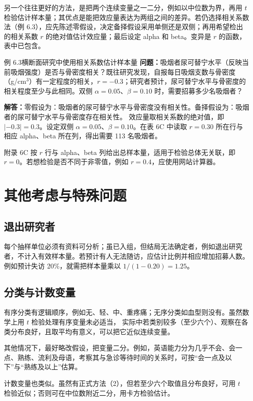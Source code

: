 另一个往往更好的方法，是把两个连续变量之一二分，例如以中位数为界，再用 $t$ 检验估计样本量；其优点是能把效应量表达为两组之间的差异。若仍选择相关系数法（例 6.3），应先陈述零假设，决定备择假设采用单侧还是双侧；再用希望检出的相关系数 $r$ 的绝对值估计效应量；最后设定 alpha 和 beta。变异是 $r$ 的函数，表中已包含。
\begin{bookbox}{例 6.3\quad 横断面研究中使用相关系数估计样本量}
\textbf{问题：}吸烟者尿可替宁水平（反映当前吸烟强度）是否与骨密度相关？既往研究发现，自报每日吸烟支数与骨密度（g/cm$^3$）有一定程度的相关，$r=-0.3$；研究者预计，尿可替宁水平与骨密度的相关程度至少与此相同。双侧 $\alpha=0.05$、$\beta=0.10$ 时，需要招募多少名吸烟者？

\textbf{解答：}零假设为：吸烟者的尿可替宁水平与骨密度没有相关性。备择假设为：吸烟者的尿可替宁水平与骨密度存在相关性。
效应量取相关系数的绝对值，即 $|-0.3|=0.3$。设定双侧 $\alpha=0.05$、$\beta=0.10$。在表 6C 中读取 $r=0.30$ 所在行与相应 alpha、beta 所在列，得出需要 113 名吸烟者。
\end{bookbox}
附录 6C 按 $r$ 行与 alpha、beta 列给出总样本量，适用于检验总体无关联，即 $r=0$。若想检验是否不同于非零值，例如 $r=0.4$，应使用网站计算器。

\section{其他考虑与特殊问题}
\subsection{退出研究者}
每个抽样单位必须有资料可分析；虽已入组，但结局无法确定者，例如退出研究者，不计入有效样本量。若预计有人无法随访，应估计比例并相应增加招募人数。例如预计失访 20\%，就需把样本量乘以 $1/(1-0.20)=1.25$。

\subsection{分类与计数变量}
有序分类有逻辑顺序，例如无、轻、中、重疼痛；无序分类如血型则没有。虽然数学上用 $t$ 检验处理有序变量未必适当，
实际中若类别较多（至少六个）、观察在各类分布良好，且取平均有意义，可以把它近似连续变量。

其他情况下，最好略改假设，把变量二分。例如，英语能力分为几乎不会、会一点、熟练、流利及母语，考察其与急诊等待时间的关系时，可按“会一点及以下”与“熟练及以上”估算。

计数变量也类似。虽然有正式方法（2），但若至少六个取值且分布良好，可用 $t$ 检验近似；否则可在中位数附近二分，用卡方检验估计。

